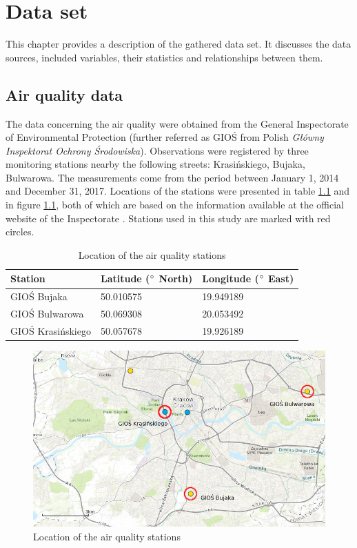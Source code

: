 \chapter{Data set}\label{chap:dataset}
This chapter provides a description of the gathered data set. It discusses the data sources, included variables, their statistics and relationships between them.

\section{Air quality data}\label{sec:air-quality-data}

The data concerning the air quality were obtained from the General Inspectorate of Environmental Protection (further referred as GIOŚ from Polish \textit{Główny Inspektorat Ochrony Środowiska}). Observations were registered by three monitoring stations nearby the following streets: Krasińskiego, Bujaka, Bulwarowa. The measurements come from the period between January 1, 2014 and December 31, 2017. Locations of the stations were presented in table \ref{tab:dataset-stations-location} and in figure \ref{fig:dataset-stations-location}, both of which are based on the information available at the official website of the Inspectorate \cite{GIOSLOCATION2018}. Stations used in this study are marked with red circles. 

\begin{table}[ht]
\centering
\caption{Location of the air quality stations}
\label{tab:dataset-stations-location}
\begin{tabular}{lll}
\toprule
Station           & Latitude ($\degree$ North) & Longitude ($\degree$ East) \\ \midrule
GIOŚ Bujaka       & 50.010575                  & 19.949189                  \\
GIOŚ Bulwarowa    & 50.069308                  & 20.053492                  \\
GIOŚ Krasińskiego & 50.057678                  & 19.926189                  \\ \bottomrule
\end{tabular}
\end{table}

\begin{figure}[ht]
\centering
\includegraphics[scale=0.5]{figures/dataset/gios_stations.png}
\caption{Location of the air quality stations}
\label{fig:dataset-stations-location}
\end{figure}

